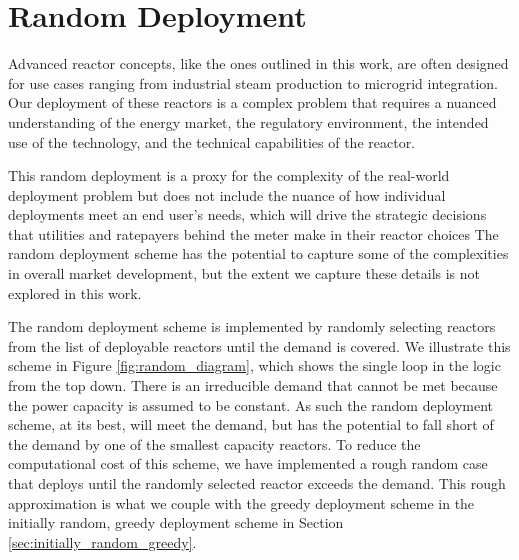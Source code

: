 \section{Random Deployment}
\label{sec:random_deployment}

Advanced reactor concepts, like the ones outlined in this work, are often
designed for use cases ranging from industrial steam production to microgrid
integration. Our deployment of these reactors is
a complex problem that requires a nuanced understanding of the energy market,
the regulatory environment, the intended use of the technology, and the
technical capabilities of the reactor.

This random deployment is a proxy for the complexity of the real-world
deployment problem but does not include the nuance of how individual
deployments meet an end user's needs, which will drive the strategic decisions
that utilities and ratepayers behind the meter make in their reactor choices
The random deployment scheme has the potential to capture some of the
complexities in overall market development, but the extent we capture these
details is not explored in this work.

The random deployment scheme is implemented by randomly selecting reactors from
the list of deployable reactors until the demand is covered. We illustrate this
scheme in Figure \ref{fig:random_diagram}, which shows the single loop in the
logic from the top down. There is an irreducible demand that cannot be met
because the power capacity is assumed to be constant. As such the random
deployment scheme, at its best, will meet the demand, but has the potential to
fall short of the demand by one of the smallest capacity reactors. To reduce
the computational cost of this scheme, we have implemented a rough random case
that deploys until the randomly selected reactor exceeds the demand. This rough
approximation is what we couple with the greedy deployment scheme in the
initially random, greedy deployment scheme in Section
\ref{sec:initially_random_greedy}.

